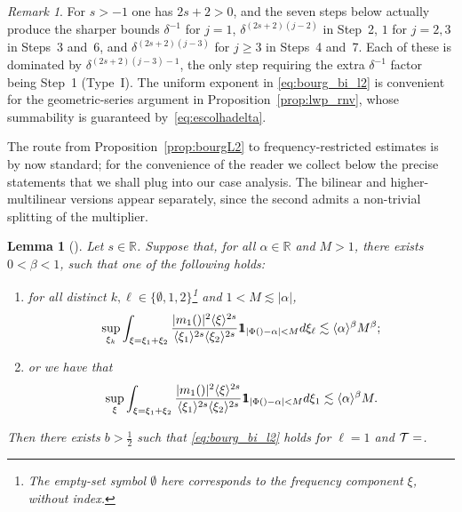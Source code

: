 \documentclass[a4paper,
11pt,  reqno]{amsart}
\makeatletter
\newcommand{\mathbbm}[1]{\mathchoice%
    {\hbox{\sffamily 1\kern-.40em 1}}%
    {\hbox{\sffamily 1\kern-.40em 1}}%
    {\hbox{\scriptsize\sffamily 1\kern-.30em 1}}%
    {\hbox{\tiny\sffamily 1\kern-.25em 1}}}%
\newcommand{\jap}[1]{\langle #1 \rangle}
\newcommand{\5}{\textup{V}}
\newtheorem{lemma}[theorem]{Lemma}
\theoremstyle{remark}
\newtheorem{remark}[theorem]{Remark}
\newcommand{\R}{\mathbb{R}}
\newcommand{\TT}{\mathcal{T}}
\newcommand{\al}{\alpha}
\renewcommand{\l}{\ell}
\def\<#1>{\csname MH@symb@#1\endcsname}
\numberwithin{equation}{section}
\numberwithin{theorem}{section}
\makeatother
\begin{document}
\begin{remark}\label{rmk:exponent_optimal}
For $s>-1$ one has $2s+2>0$, and the seven steps below actually produce the sharper bounds $\delta^{-1}$ for $j=1$, $\delta^{(2s+2)(j-2)}$ in Step~2, $1$ for $j=2,3$ in Steps~3 and~6, and $\delta^{(2s+2)(j-3)}$ for $j\ge 3$ in Steps~4 and~7. Each of these is dominated by $\delta^{(2s+2)(j-3)-1}$, the only step requiring the extra $\delta^{-1}$ factor being Step~1 (Type~I). The uniform exponent in \eqref{eq:bourg_bi_l2} is convenient for the geometric-series argument in Proposition~\ref{prop:lwp_rnv}, whose summability is guaranteed by~\eqref{eq:escolhadelta}.
\end{remark}

The route from Proposition~\ref{prop:bourgL2} to frequency-restricted estimates is by now standard; for the convenience of the reader we collect below the precise statements that we shall plug into our case analysis. The bilinear and higher-multilinear versions appear separately, since the second admits a non-trivial splitting of the multiplier.

\begin{lemma}[{\cite[Lemma 3.1]{CLS}}]\label{lem:fre_bi}
Let $s\in\R$.
Suppose that, for all $\al\in \R$ and $M>1$, there exists $0<\beta<1$, such that one of the following holds:
\begin{enumerate}
    \item[(i)] for all distinct $ k, \l\in\{\emptyset,1,2\}$\footnote{The empty-set symbol $\emptyset$ here corresponds to the frequency component $\xi$, without index.}
    and $1<M\lesssim |\alpha|$,
    \begin{equation}\label{eq:frequad}
        \sup_{\xi_k}\int_{\xi=\xi_1+\xi_2}
        \frac{|m_1(\<1>)|^2\jap{\xi}^{2s}}{\jap{\xi_{1}}^{2s}\jap{\xi_{2}}^{2s}}\mathbbm{1}_{|\Phi(\<1>)-\alpha|<M} d\xi_{\l} \lesssim \jap{\alpha}^\beta M^\beta;
    \end{equation}

    \item[(ii)] or we have that
    \begin{equation}\label{eq:frequad3}
        \sup_{\xi}\int_{\xi=\xi_1+\xi_2}\frac{|m_1(\<1>)|^2\jap{\xi}^{2s}}{\jap{\xi_{1}}^{2s}\jap{\xi_{2}}^{2s}}\mathbbm{1}_{|\Phi(\<1>)-\alpha|<M} d\xi_{1}  \lesssim \jap{\alpha}^\beta M.
    \end{equation}
\end{enumerate}
Then there exists $b>\frac12$ such that \eqref{eq:bourg_bi_l2} holds for $\ell=1$ and $\TT=\<1>$.
\end{lemma}
\end{document}

